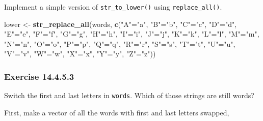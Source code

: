 \documentclass[]{book}
\newenvironment{Shaded}{\begin{snugshade}}{\end{snugshade}}
\newcommand{\KeywordTok}[1]{\textcolor[rgb]{0.13,0.29,0.53}{\textbf{#1}}}
\newcommand{\NormalTok}[1]{#1}
\newcommand{\StringTok}[1]{\textcolor[rgb]{0.31,0.60,0.02}{#1}}
\theoremstyle{plain}
\theoremstyle{remark}
\begin{document}
Implement a simple version of \texttt{str\_to\_lower()} using
\texttt{replace\_all()}.

\begin{Shaded}
\begin{Highlighting}[]
\NormalTok{lower <-}\StringTok{ }\KeywordTok{str_replace_all}\NormalTok{(words, }\KeywordTok{c}\NormalTok{(}\StringTok{"A"}\NormalTok{=}\StringTok{"a"}\NormalTok{, }\StringTok{"B"}\NormalTok{=}\StringTok{"b"}\NormalTok{, }\StringTok{"C"}\NormalTok{=}\StringTok{"c"}\NormalTok{, }\StringTok{"D"}\NormalTok{=}\StringTok{"d"}\NormalTok{, }\StringTok{"E"}\NormalTok{=}\StringTok{"e"}\NormalTok{, }\StringTok{"F"}\NormalTok{=}\StringTok{"f"}\NormalTok{, }\StringTok{"G"}\NormalTok{=}\StringTok{"g"}\NormalTok{, }\StringTok{"H"}\NormalTok{=}\StringTok{"h"}\NormalTok{, }\StringTok{"I"}\NormalTok{=}\StringTok{"i"}\NormalTok{, }\StringTok{"J"}\NormalTok{=}\StringTok{"j"}\NormalTok{, }\StringTok{"K"}\NormalTok{=}\StringTok{"k"}\NormalTok{, }\StringTok{"L"}\NormalTok{=}\StringTok{"l"}\NormalTok{, }\StringTok{"M"}\NormalTok{=}\StringTok{"m"}\NormalTok{, }\StringTok{"N"}\NormalTok{=}\StringTok{"n"}\NormalTok{, }\StringTok{"O"}\NormalTok{=}\StringTok{"o"}\NormalTok{, }\StringTok{"P"}\NormalTok{=}\StringTok{"p"}\NormalTok{, }\StringTok{"Q"}\NormalTok{=}\StringTok{"q"}\NormalTok{, }\StringTok{"R"}\NormalTok{=}\StringTok{"r"}\NormalTok{, }\StringTok{"S"}\NormalTok{=}\StringTok{"s"}\NormalTok{, }\StringTok{"T"}\NormalTok{=}\StringTok{"t"}\NormalTok{, }\StringTok{"U"}\NormalTok{=}\StringTok{"u"}\NormalTok{, }\StringTok{"V"}\NormalTok{=}\StringTok{"v"}\NormalTok{, }\StringTok{"W"}\NormalTok{=}\StringTok{"w"}\NormalTok{, }\StringTok{"X"}\NormalTok{=}\StringTok{"x"}\NormalTok{, }\StringTok{"Y"}\NormalTok{=}\StringTok{"y"}\NormalTok{, }\StringTok{"Z"}\NormalTok{=}\StringTok{"z"}\NormalTok{))}
\end{Highlighting}
\end{Shaded}

\hypertarget{exercise-14.4.5.3}{%
\subsubsection*{\texorpdfstring{Exercise
{14.4.5.3}}{Exercise 14.4.5.3}}\label{exercise-14.4.5.3}}

Switch the first and last letters in \texttt{words}. Which of those
strings are still words?

First, make a vector of all the words with first and last letters
swapped,
\end{document}
